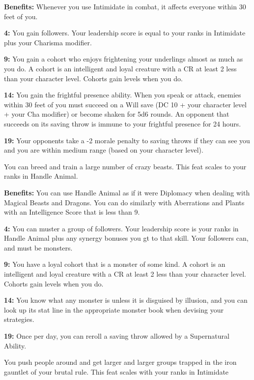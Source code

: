 \textbf{Benefits:} Whenever you use Intimidate in combat, it affects everyone within 30 feet of you.

\textbf{4:} You gain followers. Your leadership score is equal to your ranks in Intimidate plus your Charisma modifier.

\textbf{9:} You gain a cohort who enjoys frightening your underlings almost as much as you do. A cohort is an intelligent and loyal creature with a CR at least 2 less than your character level. Cohorts gain levels when you do.

\textbf{14:} You gain the frightful presence ability. When you speak or attack, enemies within 30 feet of you must succeed on a Will save (DC 10 + your character level + your Cha modifier) or become shaken for 5d6 rounds. An opponent that succeeds on its saving throw is immune to your frightful presence for 24 hours.

\textbf{19:} Your opponents take a -2 morale penalty to saving throws if they can see you and you are within medium range (based on your character level).


You can breed and train a large number of crazy beasts. This feat scales to your ranks in Handle Animal.

\textbf{Benefits:} You can use Handle Animal as if it were Diplomacy when dealing with Magical Beasts and Dragons. You can do similarly with Aberrations and Plants with an Intelligence Score that is less than 9.

\textbf{4:} You can muster a group of followers. Your leadership score is your ranks in Handle Animal plus any synergy bonuses you gt to that skill. Your followers can, and must be monsters.

\textbf{9:} You have a loyal cohort that is a monster of some kind. A cohort is an intelligent and loyal creature with a CR at least 2 less than your character level. Cohorts gain levels when you do.

\textbf{14:} You know what any monster is unless it is disguised by illusion, and you can look up its stat line in the appropriate monster book when devising your strategies.

\textbf{19:} Once per day, you can reroll a saving throw allowed by a Supernatural Ability.

You push people around and get larger and larger groups trapped in the iron gauntlet of your brutal rule. This feat scales with your ranks in Intimidate

